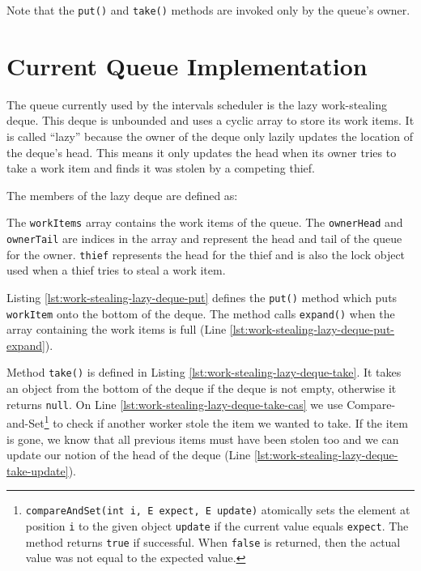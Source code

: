 Note that the \lstinline!put()! and \lstinline!take()! methods are
invoked only by the queue's owner.


\section{Current Queue Implementation}
\label{sec:queues-background-current-implementation}

The queue currently used by the intervals scheduler is the lazy
work-stealing deque. This deque is unbounded and uses a cyclic array
to store its work items. It is called ``lazy'' because the owner of
the deque only lazily updates the location of the deque's head. This
means it only updates the head when its owner tries to take a work
item and finds it was stolen by a competing thief.

The members of the lazy deque are defined as:



The \lstinline!workItems! array contains the work items of the
queue. The \lstinline!ownerHead! and \lstinline!ownerTail! are indices
in the array and represent the head and tail of the queue for the
owner. \lstinline!thief! represents the head for the thief and is also
the lock object used when a thief tries to steal a work item.

Listing \ref{lst:work-stealing-lazy-deque-put} defines the
\lstinline!put()! method which puts \lstinline!workItem! onto the
bottom of the deque. The method calls \lstinline!expand()! when the
array containing the work items is full (Line
\ref{lst:work-stealing-lazy-deque-put-expand}).



\VerbatimFootnotes Method \lstinline!take()! is defined in Listing
\ref{lst:work-stealing-lazy-deque-take}. It takes an object from the
bottom of the deque if the deque is not empty, otherwise it returns
\lstinline!null!. On Line \ref{lst:work-stealing-lazy-deque-take-cas}
we use
Compare-and-Set\footnote{\verb!compareAndSet(int i, E expect, E update)!
  atomically sets the element at position \verb!i! to the given object
  \verb!update! if the current value equals \verb!expect!. The method
  returns \verb!true! if successful. When \verb!false! is returned,
  then the actual value was not equal to the expected value.} to check
if another worker stole the item we wanted to take. If the item is
gone, we know that all previous items must have been stolen too and we
can update our notion of the head of the deque (Line
\ref{lst:work-stealing-lazy-deque-take-update}).

